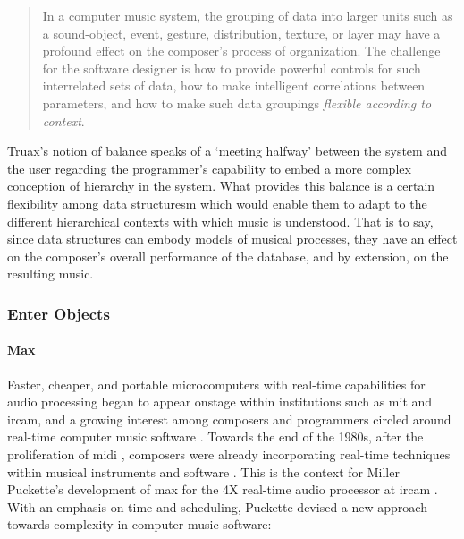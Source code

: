 	\begin{quote}
		In a computer music system, the grouping of data into larger units such as a sound-object, event, gesture, distribution, texture, or layer may have a profound effect on the composer's process of organization. The challenge for the software designer is how to provide powerful controls for such interrelated sets of data, how to make intelligent correlations between parameters, and how to make such data groupings \textit{flexible according to context}. \im \parencite[157]{Emm86:The}
	\end{quote}

	Truax's notion of balance speaks of a `meeting halfway' between the system and the user regarding the programmer's capability to embed a more complex conception of hierarchy in the system. What provides this balance is a certain flexibility among data structuresm which would enable them to adapt to the different hierarchical contexts with which music is understood. That is to say, since data structures can embody models of musical processes, they have an effect on the composer's overall performance of the database, and by extension, on the resulting music. 

\subsubsection{Enter Objects}


	\paragraph{Max}
	\label{computer:real-time}

	Faster, cheaper, and portable microcomputers with real-time capabilities for audio processing began to appear onstage within institutions such as \gls{mit} and \gls{ircam}, and a growing interest among composers and programmers circled around real-time computer music software . Towards the end of the 1980s, after the proliferation of \gls{midi} \parencite{Loy85:Mus}, composers were already incorporating real-time techniques within musical instruments and software \parencite{Ver84:The, Puc91:Som}. This is the context for Miller Puckette's development of \gls{max} for the 4X real-time audio processor at \gls{ircam} \parencite{DBLP:conf/icmc/Puckette86}. With an emphasis on time and scheduling, Puckette devised a new approach towards complexity in computer music software:


